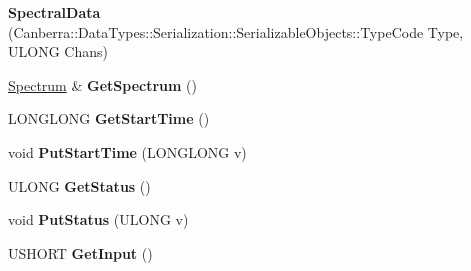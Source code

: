 \begin{DoxyCompactItemize}
\item 
\mbox{\label{class_canberra_1_1_data_types_1_1_spectroscopy_1_1_spectral_data_a6ef47d1a4dc71ff5c51e672335802ff3}} 
{\bfseries Spectral\+Data} (Canberra\+::\+Data\+Types\+::\+Serialization\+::\+Serializable\+Objects\+::\+Type\+Code Type, U\+L\+O\+NG Chans)
\item 
\mbox{\label{class_canberra_1_1_data_types_1_1_spectroscopy_1_1_spectral_data_a0a8c9a2654ccf3617dbadcf7208d267e}} 
\hyperlink{class_canberra_1_1_data_types_1_1_spectroscopy_1_1_spectrum}{Spectrum} \& {\bfseries Get\+Spectrum} ()
\item 
\mbox{\label{class_canberra_1_1_data_types_1_1_spectroscopy_1_1_spectral_data_a1933c9ba4d063cca62493e8044cc908d}} 
L\+O\+N\+G\+L\+O\+NG {\bfseries Get\+Start\+Time} ()
\item 
\mbox{\label{class_canberra_1_1_data_types_1_1_spectroscopy_1_1_spectral_data_a2bfc1fa0d79dc801ab7c7f12919465d6}} 
void {\bfseries Put\+Start\+Time} (L\+O\+N\+G\+L\+O\+NG v)
\item 
\mbox{\label{class_canberra_1_1_data_types_1_1_spectroscopy_1_1_spectral_data_abe5ff8ae288ffaa5409f8b7a8682bdd6}} 
U\+L\+O\+NG {\bfseries Get\+Status} ()
\item 
\mbox{\label{class_canberra_1_1_data_types_1_1_spectroscopy_1_1_spectral_data_a7640e7b14b6a235b97e2f4e2c59e307c}} 
void {\bfseries Put\+Status} (U\+L\+O\+NG v)
\item 
\mbox{\label{class_canberra_1_1_data_types_1_1_spectroscopy_1_1_spectral_data_a500c2dfd8d0ed8a1c115162ed9e3aa7e}} 
U\+S\+H\+O\+RT {\bfseries Get\+Input} ()
\item 
\mbox{\label{class_canberra_1_1_data_types_1_1_spectroscopy_1_1_spectral_data_a2dc78ba63476123bc153a9de23337bd4}} 

\end{DoxyCompactItemize}

